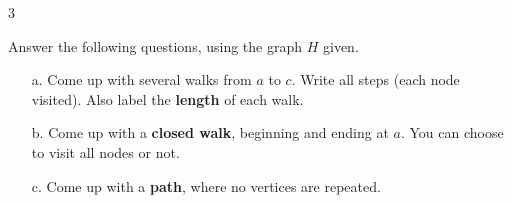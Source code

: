 \documentclass[a4paper,12pt]{book}
\newcounter{question}
\begin{document}
\begin{question}{\thequestion}{3}

    Answer the following questions, using the graph $H$ given.

    \begin{center}
    \end{center}

    \begin{enumerate}
        \item[a.]   Come up with several walks from $a$ to $c$. Write all steps (each node visited).
            Also label the \textbf{length} of each walk.
        \item[b.]   Come up with a \textbf{closed walk}, beginning and ending at $a$. You can choose to visit all nodes or not. \solution{}{ \vspace{1cm} }
        \item[c.]   Come up with a \textbf{path}, where no vertices are repeated. \solution{}{ \vspace{1cm} }
    \end{enumerate}

\end{question}

    \notonkey{ \newpage }{ \hrulefill }
\end{document}
